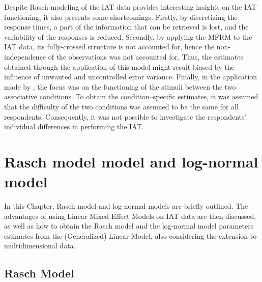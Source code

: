 \documentclass[12pt]{book}
\begin{document}


Despite Rasch modeling of the IAT data provides interesting insights on the IAT functioning, it also presents some shortcomings. Firstly, by discretizing the response times, a part of the information that can be retrieved is lost, and the variability of the responses is reduced. Secondly, by applying the MFRM to the IAT data, its fully-crossed structure is not accounted for, hence the non-independence of the observations was not accounted for. Thus, the estimates obtained through the application of this model might result biased by the influence of unwanted and uncontrolled error variance. Finally, in the application made by , the focus was on the functioning of the stimuli between the two associative conditions. To obtain the condition--specific estimates, it was assumed that the difficulty of the two conditions was assumed to be the same for all respondents. Consequently, it was not possible to investigate the respondents' individual differences in performing the IAT. 


\chapter{Rasch model model and log-normal model}
In this Chapter, Rasch model and log-normal models are briefly outlined. The advantages of using Linear Mixed Effect Models on IAT data are then discussed, as well as how to obtain the Rasch model and the log-normal model parameters estimates from the (Generalized) Linear Model, also considering the extension to multidimensional data. 

\newpage

\section{Rasch Model} \label{sec:rasch}
\end{document}
